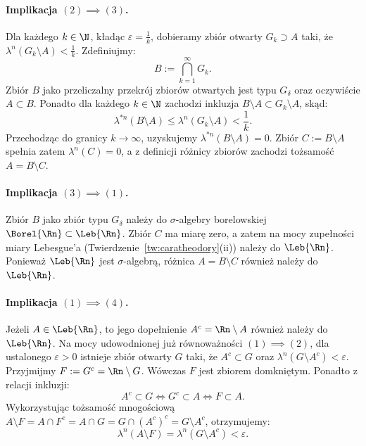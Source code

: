 \begin{dow}
    \paragraph{Implikacja $(2) \implies (3)$.}
    Dla każdego $k \in \N$, kładąc $\varepsilon = \frac{1}{k}$, dobieramy zbiór otwarty $G_k \supset A$ taki, że $\lambda^n(G_k \setminus A) < \frac{1}{k}$.
    Zdefiniujmy:
    \begin{equation*}
        B := \bigcap_{k=1}^\infty G_k.
    \end{equation*}
    Zbiór $B$ jako przeliczalny przekrój zbiorów otwartych jest typu $G_\delta$ oraz oczywiście $A \subset B$. Ponadto dla każdego $k \in \N$ zachodzi inkluzja $B \setminus A \subset G_k \setminus A$, skąd:
    \begin{equation*}
        \lambda^{*n}(B \setminus A) \le \lambda^n(G_k \setminus A) < \frac{1}{k}.
    \end{equation*}
    Przechodząc do granicy $k \to \infty$, uzyskujemy $\lambda^{*n}(B \setminus A) = 0$. Zbiór $C := B \setminus A$ spełnia zatem $\lambda^n(C) = 0$, a z definicji różnicy zbiorów zachodzi tożsamość $A = B \setminus C$.

    \paragraph{Implikacja $(3) \implies (1)$.}
    Zbiór $B$ jako zbiór typu $G_\delta$ należy do $\sigma$-algebry borelowskiej $\Borel{\Rn} \subset \Leb{\Rn}$. Zbiór $C$ ma miarę zero, a zatem na mocy zupełności miary Lebesgue'a (Twierdzenie~\ref{tw:caratheodory}(ii)) należy do $\Leb{\Rn}$. Ponieważ $\Leb{\Rn}$ jest $\sigma$-algebrą, różnica $A = B \setminus C$ również należy do $\Leb{\Rn}$.

    \paragraph{Implikacja $(1) \implies (4)$.}
    Jeżeli $A \in \Leb{\Rn}$, to jego dopełnienie $A^c = \Rn \setminus A$ również należy do $\Leb{\Rn}$. Na mocy udowodnionej już równoważności $(1) \implies (2)$, dla ustalonego $\varepsilon > 0$ istnieje zbiór otwarty $G$ taki, że $A^c \subset G$ oraz $\lambda^n(G \setminus A^c) < \varepsilon$.
    Przyjmijmy $F := G^c = \Rn \setminus G$. Wówczas $F$ jest zbiorem domkniętym. Ponadto z relacji inkluzji:
    \begin{equation*}
        A^c \subset G \iff G^c \subset A \iff F \subset A.
    \end{equation*}
    Wykorzystując tożsamość mnogościową $A \setminus F = A \cap F^c = A \cap G = G \cap (A^c)^c = G \setminus A^c$, otrzymujemy:
    \begin{equation*}
        \lambda^n(A \setminus F) = \lambda^n(G \setminus A^c) < \varepsilon.
    \end{equation*}


\end{dow}
